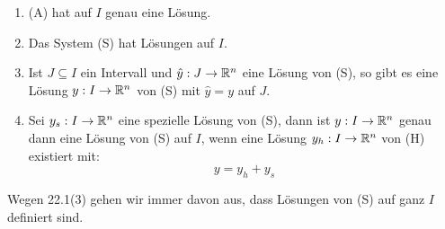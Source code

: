 \documentclass[a4paper,twoside,DIV15,BCOR12mm,chapterprefix=true,headings=twolinechapter]{scrbook}
\begin{document}
\begin{satz}[Lösungen]
\begin{enumerate}
\item (A) hat auf $I$ genau eine Lösung.
\item Das System (S) hat Lösungen auf $I$.
\item Ist $J\subseteq I$ ein Intervall und $\hat y:J\to\mathbb{R}^n$ eine Lösung von (S),
so gibt es eine Lösung $y:I\to\mathbb{R}^n$ von (S) mit $\hat y=y$ auf $J$.
\item Sei $y_s:I\to\mathbb{R}^n$ eine spezielle Lösung von (S), dann ist $y:I\to\mathbb{R}^n$ genau dann eine
Lösung von (S) auf $I$, wenn eine Lösung $y_h:I\to\mathbb{R}^n$ von (H) existiert mit:
\[y=y_h+y_s\]
\end{enumerate}
\end{satz}

\begin{wichtigebemerkung}
Wegen 22.1(3) gehen wir immer davon aus, dass Lösungen von (S) auf ganz $I$ definiert sind.
\end{wichtigebemerkung}
\end{document}
